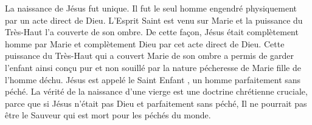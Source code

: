 La naissance de Jésus fut unique. Il fut le seul homme engendré physiquement par un acte direct de Dieu. L'Esprit Saint est venu sur Marie et la puissance du Très-Haut l'a couverte de son ombre. De cette façon, Jésus était complètement homme par Marie et complètement Dieu par cet acte direct de Dieu. Cette puissance du Très-Haut qui a couvert Marie de son ombre a permis de garder l'enfant ainsi conçu pur et non souillé par la nature pécheresse de Marie fille de l'homme déchu. Jésus est appelé le \Og Saint Enfant \Fg, un homme parfaitement sans péché. La vérité de la naissance d'une vierge est une doctrine chrétienne cruciale, parce que si Jésus n'était pas Dieu et parfaitement sans péché, Il ne pourrait pas être le Sauveur qui est mort pour les péchés du monde.


\begin{dvquotes}
\end{dvquotes}

